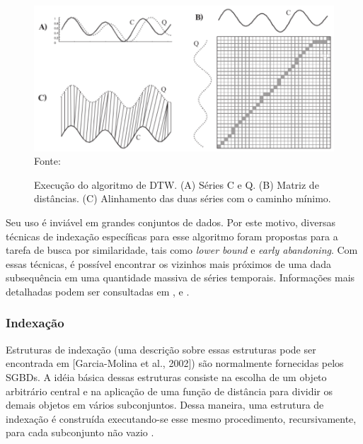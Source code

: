 \begin{figure}[!htb]
   \centering
   \caption{Execução do algoritmo de DTW. (A) Séries C e Q. (B) Matriz de distâncias. (C) Alinhamento das duas séries com o caminho mínimo.}\label{fig:dtw} 
   \includegraphics[scale=0.40]{figuras/dtw.png}
   \\Fonte: \cite{keogh2004}
\end{figure}

Seu uso é inviável em grandes conjuntos de dados. Por este motivo, diversas técnicas de indexação específicas para esse algoritmo foram propostas para a tarefa de busca por similaridade, tais como \textit{lower bound} e \textit{early abandoning}. Com essas técnicas, é possível encontrar os vizinhos mais próximos de uma dada subsequência em uma quantidade massiva de séries temporais. Informações mais detalhadas podem ser consultadas em \cite{mizutani2006}, \cite{kruskal1983} e \cite{juang1991}.


\subsubsection{Indexação}\label{subsubsec:indexacao}
Estruturas de indexação (uma descrição sobre essas estruturas pode ser encontrada em [Garcia-Molina et al., 2002]) são normalmente fornecidas pelos SGBDs. A idéia básica dessas estruturas consiste na escolha de um objeto arbitrário central e na aplicação de uma função de distância para dividir os demais objetos em vários subconjuntos. Dessa maneira, uma estrutura de indexação é construída executando-se esse mesmo procedimento, recursivamente, para cada subconjunto não vazio \cite{barioni2006}.

